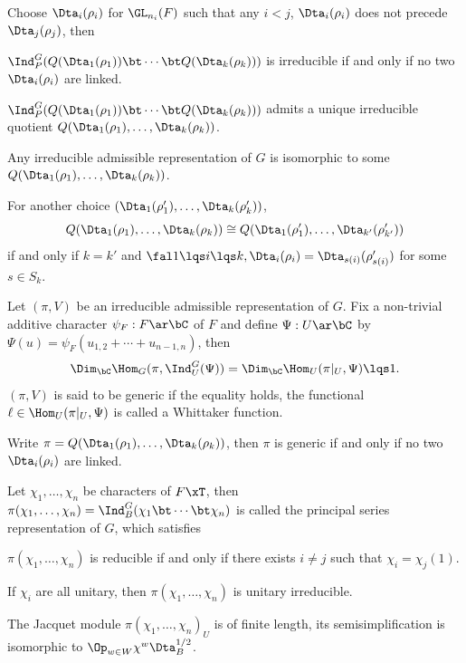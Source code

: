 \documentclass[a4paper, twoside]{article}
\begin{document}
\begin{thm}[{\cite[8.1]{PR2008}}]
	Choose $\Dta_{i}(\rho_{i})$ for $\GL_{n_{i}}(F)$ such that any $i<j$, $\Dta_{i}(\rho_{i})$ does not precede $\Dta_{j}(\rho_{j})$, then
	\begin{enr}
		\item $\Ind_{P}^{G}(Q(\Dta_{1}(\rho_{1}))\bt\cdots\bt Q(\Dta_{k}(\rho_{k})))$ is irreducible if and only if no two $\Dta_{i}(\rho_{i})$ are linked.
		\item $\Ind_{P}^{G}(Q(\Dta_{1}(\rho_{1}))\bt\cdots\bt Q(\Dta_{k}(\rho_{k})))$ admits a unique irreducible quotient $Q(\Dta_{1}(\rho_{1}),\ldots,\Dta_{k}(\rho_{k}))$.
		\item Any irreducible admissible representation of $G$ is isomorphic to some $Q(\Dta_{1}(\rho_{1}),\ldots,\Dta_{k}(\rho_{k}))$.
		\item For another choice $(\Dta_{1}(\rho_{1}'),\ldots,\Dta_{k}(\rho_{k}'))$,
		\[
			Q(\Dta_{1}(\rho_{1}),\ldots,\Dta_{k}(\rho_{k}))\cong Q(\Dta_{1}(\rho_{1}'),\ldots,\Dta_{k'}(\rho_{k'}'))
		\]
		if and only if $k=k'$ and $\fal 1\lqs i\lqs k, \Dta_{i}(\rho_{i})=\Dta_{s(i)}(\rho_{s(i)}')$ for some $s\in S_{k}$.
	\end{enr}
\end{thm}

\begin{thm}[{\cite[9.1, 9.2, 9.3]{PR2008}}]
	Let $(\pi,V)$ be an irreducible admissible representation of $G$. Fix a non-trivial additive character $\psi_{F}:F\ar\bC$ of $F$ and define $\Psi:U\ar\bC$ by $\Psi(u)=\psi_{F}(u_{1,2}+\cdots+u_{n-1,n})$, then
	\[
		\Dim_{\bC}\Hom_{G}(\pi,\Ind_{U}^{G}(\Psi))=\Dim_{\bC}\Hom_{U}(\pi|_{U},\Psi)\lqs1.
	\]
	$(\pi,V)$ is said to be generic if the equality holds, the functional $\ell\in\Hom_{U}(\pi|_{U},\Psi)$ is called a Whittaker function.

	Write $\pi=Q(\Dta_{1}(\rho_{1}),\ldots,\Dta_{k}(\rho_{k}))$, then $\pi$ is generic if and only if no two $\Dta_{i}(\rho_{i})$ are linked.
\end{thm}


\begin{thm}[{\cite[4.2]{PR2008}}]
	Let $\chi_{1},\ldots,\chi_{n}$ be characters of $F\xT$, then $\pi(\chi_{1},\ldots,\chi_{n})=\Ind_{B}^{G}(\chi_{1}\bt\cdots\bt\chi_{n})$ is called the principal series representation of $G$, which satisfies
	\begin{enr}
		\item $\pi(\chi_{1},\ldots,\chi_{n})$ is reducible if and only if there exists $i\neq j$ such that $\chi_{i}=\chi_{j}(1)$.
		\item If $\chi_{i}$ are all unitary, then $\pi(\chi_{1},\ldots,\chi_{n})$ is unitary irreducible.
	\end{enr}

	The Jacquet module $\pi(\chi_{1},\ldots,\chi_{n})_{U}$ is of finite length, its semisimplification is isomorphic to $\Op_{w\in W}\chi^{w}\Dta_{B}^{1/2}$.
\end{thm}
\end{document}
